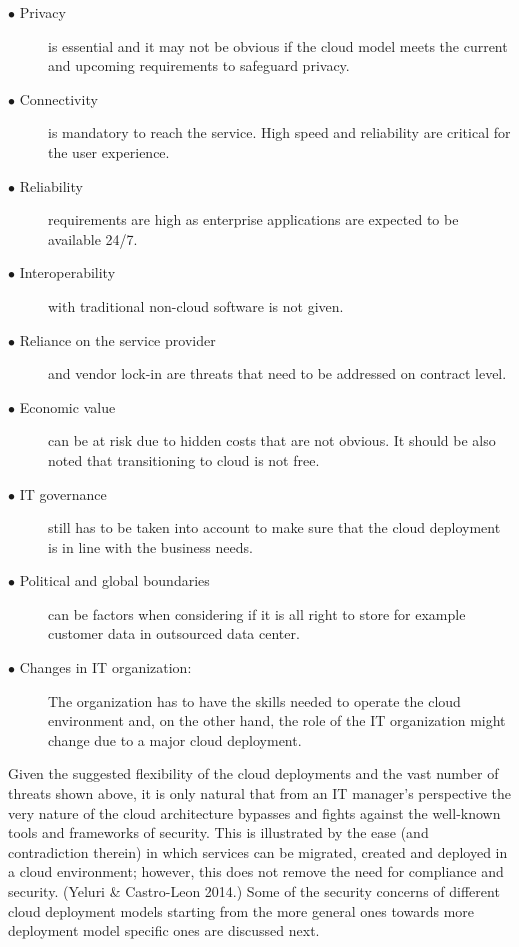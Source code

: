 \documentclass{article}
\begin{document}
\begin{description}
        \item[$\bullet$ Privacy] is essential and it may not be obvious if the cloud model meets the current and upcoming requirements to safeguard privacy.
        \item[$\bullet$ Connectivity] is mandatory to reach the service. High speed and reliability are critical for the user experience.
        \item[$\bullet$ Reliability] requirements are high as enterprise applications are expected to be available 24/7.
        \item[$\bullet$ Interoperability] with traditional non-cloud software is not given.
        \item[$\bullet$ Reliance on the service provider] and vendor lock-in are threats that need to be addressed on contract level.
        \item[$\bullet$ Economic value] can be at risk due to hidden costs that are not obvious. It should be also noted that transitioning to cloud is not free.
        \item[$\bullet$ IT governance] still has to be taken into account to make sure that the cloud deployment is in line with the business needs.
        \item[$\bullet$ Political and global boundaries] can be factors when considering if it is all right to store for example customer data in outsourced data center.
        \item[$\bullet$ Changes in IT organization:] The organization has to have the skills needed to operate the cloud environment and, on the other hand, the role of the IT organization might change due to a major cloud deployment.
\end{description}
Given the suggested flexibility of the cloud deployments and the vast number of threats shown above, it is only natural that from an IT manager's perspective the very nature of the cloud architecture bypasses and fights against the well-known tools and frameworks of security.
This is illustrated by the ease (and contradiction therein) in which services can be migrated, created and deployed in a cloud environment; however, this does not remove the need for compliance and security. (Yeluri \& Castro-Leon 2014.)
Some of the security concerns of different cloud deployment models starting from the more general ones towards more deployment model specific ones are discussed next.
\end{document}
